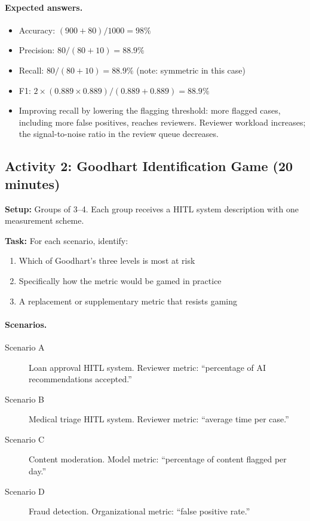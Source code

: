 \paragraph{Expected answers.}

\begin{itemize}
    \item Accuracy: $(900+80)/1000 = 98\%$
    \item Precision: $80/(80+10) = 88.9\%$
    \item Recall: $80/(80+10) = 88.9\%$ (note: symmetric in this case)
    \item F1: $2 \times (0.889 \times 0.889) / (0.889 + 0.889) = 88.9\%$
    \item Improving recall by lowering the flagging threshold: more flagged cases, including more false positives, reaches reviewers. Reviewer workload increases; the signal-to-noise ratio in the review queue decreases.
\end{itemize}

\subsection{Activity 2: Goodhart Identification Game (20 minutes)}

\textbf{Setup:} Groups of 3--4. Each group receives a HITL system description with one measurement scheme.

\textbf{Task:} For each scenario, identify:
\begin{enumerate}
    \item Which of Goodhart's three levels is most at risk
    \item Specifically how the metric would be gamed in practice
    \item A replacement or supplementary metric that resists gaming
\end{enumerate}

\paragraph{Scenarios.}
\begin{description}
    \item[Scenario A] Loan approval HITL system. Reviewer metric: ``percentage of AI recommendations accepted.''
    \item[Scenario B] Medical triage HITL system. Reviewer metric: ``average time per case.''
    \item[Scenario C] Content moderation. Model metric: ``percentage of content flagged per day.''
    \item[Scenario D] Fraud detection. Organizational metric: ``false positive rate.''
\end{description}

